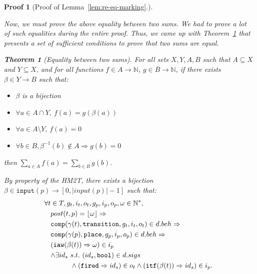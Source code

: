 \documentclass[pdflatex,sn-mathphys]{sn-jnl}%
\theoremstyle{thmstyleone}%
\newtheorem{theorem}{Theorem}%
\theoremstyle{thmstyletwo}%
\newtheorem*{pf}{Proof}%
\theoremstyle{thmstylethree}%
\begin{document}
\begin{pf}[Proof of Lemma~\ref{lem:re-eq-marking}.]
\begin{itemize}
    Now, we must prove the above equality between two sums. We had to
    prove a lot of such equalities during the entire proof. Thus, we
    came up with Theorem~\ref{thm:sums-equal} that presents a set of
    sufficient conditions to prove that two sums are equal.
    
    \begin{theorem}[Equality between two sums]
      \label{thm:sums-equal}
      For all sets $X,Y,A,B$ such that $A\subseteq{}X$ and
      $Y\subseteq{}X$, and for all functions
      $f\in{}A\rightarrow\mathbb{N}$, $g\in{}B\rightarrow\mathbb{N}$,
      if there exists $\beta\in{}Y\rightarrow{}B$ such that:
      \begin{itemize}
      \item $\beta$ is a bijection
      \item $\forall{}a\in{}A\cap{}Y,~f(a)=g(\beta(a))$
      \item $\forall{}a\in{}A\setminus{}Y,~f(a)=0$
      \item $\forall{}b\in{}B,\beta^{-1}(b)\notin{}A\Rightarrow{}g(b)=0$
      \end{itemize}
      then $\sum\limits_{a\in{}A}f(a)=\sum\limits_{b\in{}B}g(b)$.
    \end{theorem}
    
    By property of the HM2T, there exists a bijection
    $\beta\in\mathtt{input}(p)\rightarrow{}[0,\vert{}input(p)\vert-1]$
    such that:
    \begin{equation}
      \label{eq:bij-input}
      \begin{aligned}[t]
        \forall{}t&\in{}T,g_t,i_t,o_t,g_p,i_p,o_p,\omega\in\mathbb{N}^{*}, \\
                  & post(t,p)=\lfloor\omega\rfloor\Rightarrow \\
                  & \mathtt{comp}(\gamma(t),\mathtt{transition},g_t,i_t,o_t)\in{}d.beh\Rightarrow \\
                  & \mathtt{comp}(\gamma(p),\mathtt{place},g_p,i_p,o_p)\in{}d.beh\Rightarrow\\
                  &
                    \begin{aligned}[t]
                      & (\mathtt{iaw}(\beta(t))\Rightarrow\omega)\in{}i_p \\
                      & \begin{aligned}[t]
                          \land\exists{}id_s~&s.t.~(id_s,\mathtt{bool})\in{}d.sigs \\
                                             & \land(\mathtt{fired}\Rightarrow{}id_s)\in{}o_t\land(\mathtt{itf}(\beta(t))\Rightarrow{}id_s)\in{}i_p.\\
                        \end{aligned} \\
                    \end{aligned}
        \\
      \end{aligned}
    \end{equation}


\end{itemize}
\end{pf}
\end{document}
